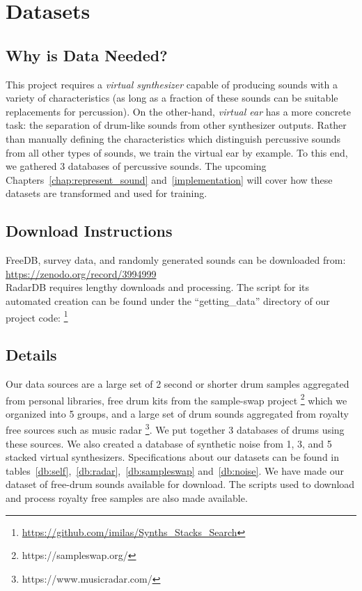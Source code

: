 \documentclass[\main/thesis.tex]{subfiles}
\begin{document}
\chapter{Datasets}

\section{Why is Data Needed?}
This project requires a \textit{virtual synthesizer} capable of producing sounds with a variety of characteristics (as long as a fraction of these sounds can be suitable replacements for percussion). On the other-hand, \textit{virtual ear} has a more concrete task: the separation of drum-like sounds from other synthesizer outputs. Rather than manually defining the characteristics which distinguish percussive sounds from all other types of sounds, we train the virtual ear by example. To this end, we gathered 3 databases of percussive sounds. The upcoming Chapters~\ref{chap:represent_sound} and~\ref{implementation} will cover how these datasets are transformed and used for training.


\label{appendix:datasets}
\section{Download Instructions}
FreeDB, survey data, and randomly generated sounds can be downloaded from: \url{https://zenodo.org/record/3994999}\\
RadarDB requires lengthy downloads and processing. The script for its automated creation can be found under the \enquote{getting\_data} directory of our project code: \footnote{\url{https://github.com/imilas/Synths_Stacks_Search}}
\section{Details}
Our data sources are a large set of 2 second or shorter drum samples aggregated from personal libraries, free drum kits from the sample-swap project \footnote{https://sampleswap.org/} which we organized into 5 groups, and a large set of drum sounds aggregated from royalty free sources such as music radar \footnote{https://www.musicradar.com/}. We put together 3 databases of drums using these sources. We also created a database of synthetic noise from 1, 3, and 5 stacked virtual synthesizers. Specifications about our datasets can be found in tables~\ref{db:self},~\ref{db:radar},~\ref{db:sampleswap} and~\ref{db:noise}. We have made our dataset of free-drum sounds available for download. The scripts used to download and process royalty free samples are also made available. 
\end{document}
